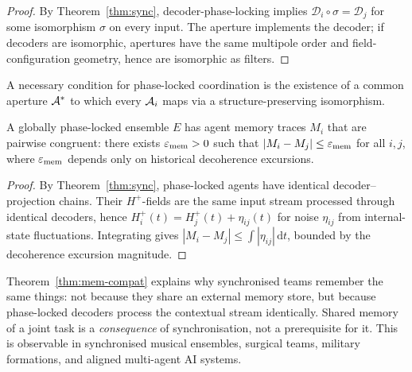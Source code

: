 \begin{proof}
By Theorem~\ref{thm:sync}, decoder-phase-locking implies
$\mathcal{D}_i\circ\sigma=\mathcal{D}_j$ for some isomorphism $\sigma$ on
every input. The aperture implements the decoder; if decoders are isomorphic,
apertures have the same multipole order and field-configuration geometry,
hence are isomorphic as filters.
\end{proof}

\begin{corollary}\label{cor:aper-mediated}
A necessary condition for phase-locked coordination is the existence of a
common aperture $\mathcal{A}^*$ to which every $\mathcal{A}_i$ maps via a
structure-preserving isomorphism.
\end{corollary}

\begin{theorem}\label{thm:mem-compat}
A globally phase-locked ensemble $E$ has agent memory traces $M_i$ that are
pairwise congruent: there exists $\varepsilon_{\mathrm{mem}}>0$ such that
$|M_i-M_j|\le\varepsilon_{\mathrm{mem}}$ for all $i,j$, where
$\varepsilon_{\mathrm{mem}}$ depends only on historical decoherence excursions.
\end{theorem}

\begin{proof}
By Theorem~\ref{thm:sync}, phase-locked agents have identical
decoder--projection chains. Their $H^+$-fields are the same input stream
processed through identical decoders, hence
$H^+_i(t)=H^+_j(t)+\eta_{ij}(t)$ for noise $\eta_{ij}$ from
internal-state fluctuations. Integrating gives
$|M_i-M_j|\le\int|\eta_{ij}|\,\mathrm{d}t$, bounded by the decoherence
excursion magnitude.
\end{proof}

\begin{remark}\label{rem:mem-interp}
Theorem~\ref{thm:mem-compat} explains why synchronised teams remember the
same things: not because they share an external memory store, but because
phase-locked decoders process the contextual stream identically. Shared
memory of a joint task is a \emph{consequence} of synchronisation, not a
prerequisite for it. This is observable in synchronised musical ensembles,
surgical teams, military formations, and aligned multi-agent AI systems.
\end{remark}

